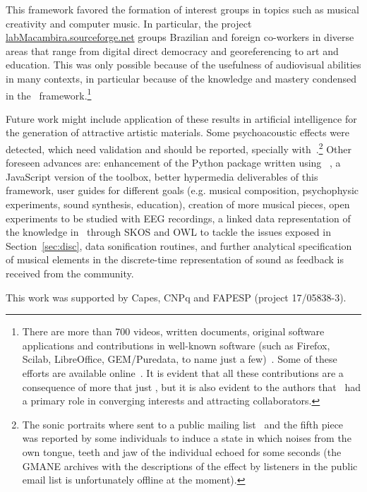 This framework favored the formation of interest groups in topics such as musical creativity and computer music.
In particular, the project \url{labMacambira.sourceforge.net} groups Brazilian and foreign co-workers
in diverse areas that range from digital direct democracy and georeferencing to art and education.
This was only possible because of the usefulness of audiovisual abilities in many contexts, in particular because of the knowledge and mastery condensed in the \massa\ framework.\footnote{There are more than 700 videos, written documents,
 original software applications and contributions in well-known software (such as Firefox, Scilab, LibreOffice, GEM/Puredata, to name just a few)~\cite{siteLM,wikiLM,vimeoLM}.
Some of these efforts are available online~\cite{dissertacao}.
It is evident that all these contributions are a consequence of more that just \massa, but it is also evident to the authors that \massa\ had a primary role in converging interests and attracting collaborators.}

Future work might include application of these results in artificial intelligence
for the generation of attractive artistic materials. Some psychoacoustic effects were detected,
which need validation and should be reported, specially with~\cite{quadrosSonoros}.\footnote{The sonic portraits where sent to a public mailing list~\cite{metaLista} and the fifth piece was reported by some individuals to induce a state in which noises from the own tongue, teeth and jaw of the individual echoed for some seconds (the GMANE archives with the descriptions of the effect by listeners in the public email list is unfortunately offline at the moment).} Other foreseen advances
are: enhancement of the Python package written using \massa~\cite{music}, a JavaScript version of the toolbox, better hypermedia deliverables of this framework, user guides
for different goals (e.g. musical composition, psychophysic experiments, sound synthesis, education), creation
of more musical pieces, open experiments to be studied with EEG recordings, a linked data representation
of the knowledge in \massa\ through SKOS and OWL to tackle the issues exposed in Section~\ref{sec:disc},
data sonification routines, and further analytical specification of musical
elements in the discrete-time representation of sound as feedback is received from the community.

\begin{acks}
    This work was supported by Capes, CNPq and FAPESP (project 17/05838-3).
\end{acks}


% 

